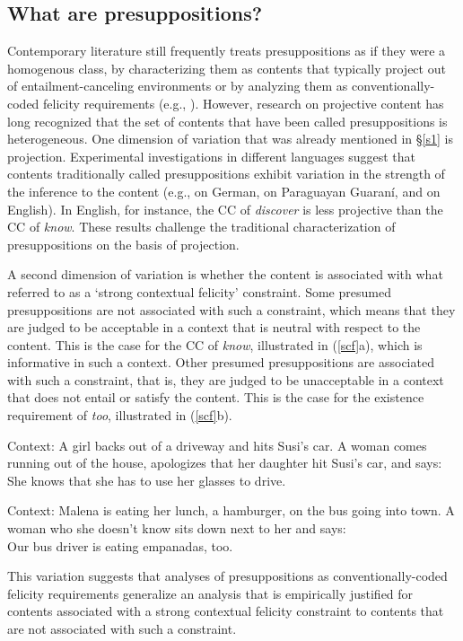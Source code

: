 \documentclass[11pt,fleqn]{article}
\def\infelic{{\leavevmode\llap{\#}}}
\newcommand{\6}{\mbox{$[\hspace*{-.6mm}[$}}
\newcommand{\9}{\mbox{$]\hspace*{-.6mm}]$}}
\begin{document}
\subsection{What are presuppositions?}

Contemporary literature still frequently treats presuppositions as if they were a homogenous class, by characterizing them as contents that typically project out of entailment-canceling environments or by analyzing them as conventionally-coded felicity requirements (e.g., \citealt{mandelkern-etal2020}). However, research on projective content has long recognized that the set of contents that have been called presuppositions is heterogeneous. One dimension of variation that was already mentioned in \S\ref{s1} is projection. Experimental investigations in different languages suggest that contents traditionally called presuppositions exhibit variation in the strength of the inference to the content (e.g., \citealt{xue-onea11} on German, \citealt{tonhauser-guarani-variability} on Paraguayan Guaran\'i, and \citealt{demarneffe-etal-sub23,tbd-variability,degen-tonhauser-language} on English). In English, for instance, the CC of {\em discover} is less projective than the CC of {\em know}. These results challenge the traditional characterization of presuppositions on the basis of projection.

A second dimension of variation is whether the content is associated with what \citealt{brst-lang11} referred to as a `strong contextual felicity' constraint. Some presumed presuppositions are not associated with such a constraint, which means that they are judged to be acceptable in a context that is neutral with respect to the content. This is the case for the CC of {\em know}, illustrated in (\ref{scf}a), which is informative in such a context. Other presumed presuppositions are associated with such a constraint, that is, they are judged to be unacceptable in a context that does not entail or satisfy the content. This is the case for the existence requirement of {\em too}, illustrated in (\ref{scf}b).

\begin{exe}
\ex\label{scf} \citealt[78, 80]{brst-lang11}
\begin{xlist}
\ex Context: A girl backs out of a driveway and hits Susi's car. A woman comes running out of the house, apologizes that her daughter hit Susi's car, and says: \\ She knows that she has to use her glasses to drive.

\ex Context: Malena is eating her lunch, a hamburger, on the bus going into town. A woman who she doesn't know sits down next to her and says:
\\ \infelic Our bus driver is eating empanadas, too.

\end{xlist}
\end{exe}
This variation suggests that analyses of presuppositions as conventionally-coded felicity requirements generalize an analysis that is empirically justified for contents associated with a strong contextual felicity constraint to contents that are not associated with such a constraint. 
\end{document}
